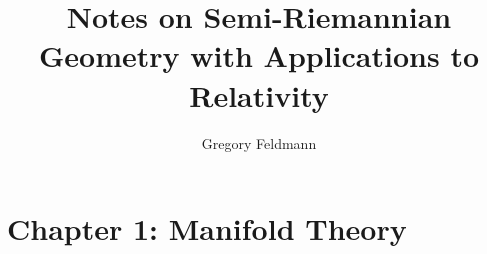 \documentclass[]{article}
\title{Notes on Semi-Riemannian Geometry with Applications to Relativity}
\author{Gregory Feldmann}
\begin{document}
\maketitle

\section{Chapter 1: Manifold Theory}
\end{document}
